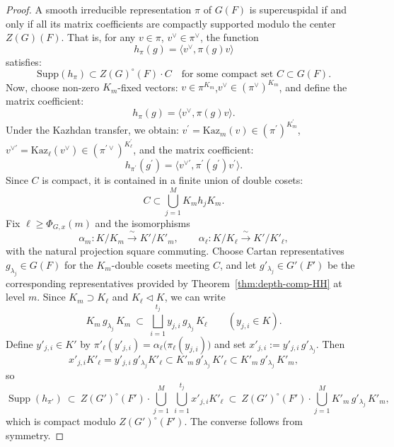 \documentclass[american]{article}
\numberwithin{equation}{section}
\numberwithin{figure}{section}
\theoremstyle{plain}
\theoremstyle{definition}
\theoremstyle{remark}
\DeclareMathOperator{\Supp}{Supp}
\begin{document}
\begin{proof}
A smooth irreducible representation \(\pi\) of \(G(F)\) is supercuspidal if and only if all its matrix coefficients are compactly supported modulo the center \(Z(G)(F)\). That is, for any \(v \in \pi\), \(v^\vee \in \pi^\vee\), the function  
\[
h_\pi(g) = \langle v^\vee, \pi(g)v \rangle
\] satisfies:  
\[
\mathrm{Supp}(h_\pi) \subset Z(G)^{\circ}(F) \cdot C \quad \text{for some compact set } C \subset G(F).
\]
Now, choose non-zero \(K_{m}\)-fixed vectors:
 \(v \in \pi^{K_{m}}\),\qquad  \(v^\vee \in (\pi^\vee)^{K_{m}}\),
and define the matrix coefficient:
\[
h_\pi(g) = \langle v^\vee, \pi(g)v \rangle.
\]
Under the Kazhdan transfer, we obtain:
 \(v^{\prime} = \mathrm{Kaz}_{m}(v) \in (\pi^{\prime})^{K_{m}^{\prime}}\), \qquad  \(v^{\vee\prime} = \mathrm{Kaz}_{\ell}(v^\vee) \in (\pi^{\prime\vee})^{K_{\ell}^{\prime}}\),
and the matrix coefficient:
  \[
  h_{\pi^{\prime}}(g^{\prime}) = \langle v^{\vee\prime}, \pi^{\prime}(g^{\prime}) v^{\prime} \rangle.
  \]
  Since \(C\) is compact, it is contained in a finite union of double cosets:
\[
C \subset \bigcup_{j=1}^M K_{m} h_j K_{m}.
\]
Fix \(\ell\ge \Phi_{G,x}(m)\) and the isomorphisms
\[
\alpha_m:K/K_m\xrightarrow{\ \sim\ }K'/K'_m,\qquad
\alpha_\ell:K/K_\ell\xrightarrow{\ \sim\ }K'/K'_\ell,
\]
with the natural projection square commuting. Choose Cartan representatives
\(g_{\lambda_j}\in G(F)\) for the \(K_m\)-double cosets meeting \(C\), and let
\(g'_{\lambda_j}\in G'(F')\) be the corresponding representatives provided by
Theorem~\ref{thm:depth-comp-HH} at level \(m\).
Since \(K_m\supset K_\ell\) and \(K_\ell\lhd K\), we can write
\[
K_m\,g_{\lambda_j}\,K_m\ \subset\ \bigsqcup_{i=1}^{t_j} y_{j,i}\,g_{\lambda_j}\,K_\ell
\qquad (y_{j,i}\in K).
\]
Define \(y'_{j,i}\in K'\) by \(\pi'_\ell(y'_{j,i})=\alpha_\ell\bigl(\pi_\ell(y_{j,i})\bigr)\) and set
\(x'_{j,i}:=y'_{j,i}\,g'_{\lambda_j}\).
Then
\[
x'_{j,i}K'_\ell
= y'_{j,i}\,g'_{\lambda_j}K'_\ell
\subset K'_m\,g'_{\lambda_j}\,K'_\ell
\subset K'_m\,g'_{\lambda_j}\,K'_m,
\]
so
\[
\Supp(h_{\pi'})\ \subset\ Z(G')^\circ(F')\cdot
\bigcup_{j=1}^M\ \bigcup_{i=1}^{t_j} x'_{j,i}K'_\ell\ \subset\
Z(G')^\circ(F')\cdot\bigcup_{j=1}^M K'_m\,g'_{\lambda_j}\,K'_m,
\]
which is compact modulo \(Z(G')^\circ(F')\).
The converse follows from symmetry.


\end{proof}
\end{document}
